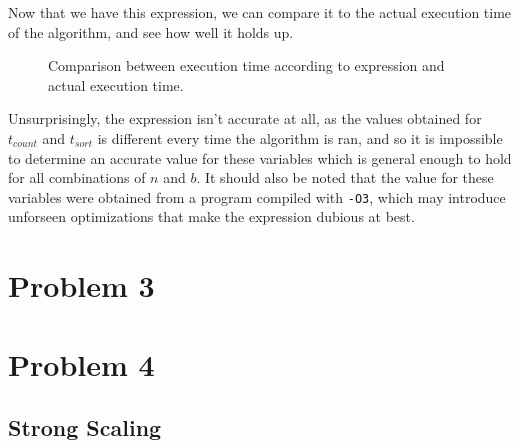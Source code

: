 \documentclass{article}
\begin{document}
Now that we have this expression, we can compare it to the actual execution time of the algorithm, and see how well it holds up. 


\testdata
\begin{figure}[H]
    \begin{center}
    \end{center}
    \caption{Comparison between execution time according to expression and actual execution time.}
\end{figure}

Unsurprisingly, the expression isn't accurate at all, as the values obtained for \( t_{count} \) and \( t_{sort} \) is different every time the algorithm is ran, and so it is impossible to determine an accurate value for these variables which is general enough to hold for all combinations of \( n \) and \( b \). It should also be noted that the value for these variables were obtained from a program compiled with \texttt{-O3}, which may introduce unforseen optimizations that make the expression dubious at best.


\section*{Problem 3}

\section*{Problem 4}

\subsection*{Strong Scaling}

\testdata
\end{document}
